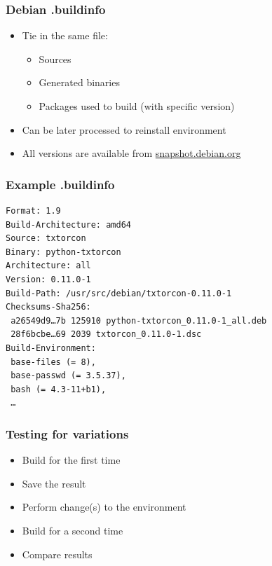 \documentclass[14pt]{beamer}
\begin{document}
\begin{frame}
 \frametitle{Debian .buildinfo}

 \begin{itemize}
  \item Tie in the same file:
   \begin{itemize}
    \item Sources
    \item Generated binaries
    \item Packages used to build (with specific version)
   \end{itemize}
  \item Can be later processed to reinstall environment
  \item All versions are available from \url{snapshot.debian.org}
 \end{itemize}
\end{frame}

\begin{frame}[fragile]
 \frametitle{Example .buildinfo}

{\small
\begin{verbatim}
Format: 1.9
Build-Architecture: amd64
Source: txtorcon
Binary: python-txtorcon
Architecture: all
Version: 0.11.0-1
Build-Path: /usr/src/debian/txtorcon-0.11.0-1
Checksums-Sha256:
 a26549d9…7b 125910 python-txtorcon_0.11.0-1_all.deb
 28f6bcbe…69 2039 txtorcon_0.11.0-1.dsc
Build-Environment:
 base-files (= 8),
 base-passwd (= 3.5.37),
 bash (= 4.3-11+b1),
 …
\end{verbatim}
}
\end{frame}

\begin{frame}
 \frametitle{Testing for variations}

 \begin{itemize}
  \item Build for the first time
  \item Save the result
  \item Perform change(s) to the environment
  \item Build for a second time
  \item Compare results
 \end{itemize}
\end{frame}
\end{document}
